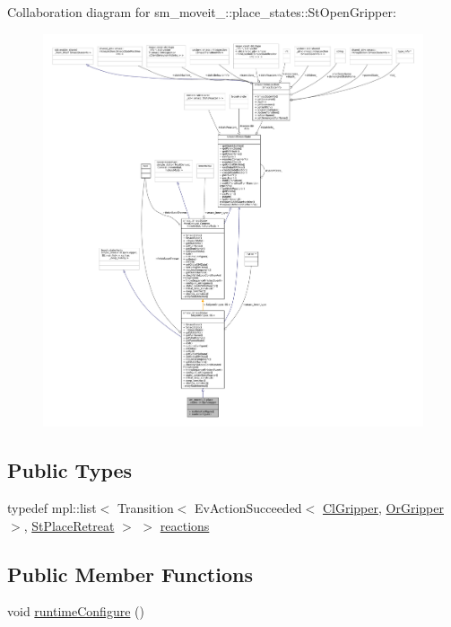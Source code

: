 Collaboration diagram for sm\+\_\+moveit\+\_\+:\+:place\+\_\+states\+:\+:St\+Open\+Gripper\+:
\nopagebreak
\begin{figure}[H]
\begin{center}
\leavevmode
\includegraphics[width=350pt]{structsm__moveit__4_1_1place__states_1_1StOpenGripper__coll__graph}
\end{center}
\end{figure}
\subsection*{Public Types}
\begin{DoxyCompactItemize}
\item 
typedef mpl\+::list$<$ Transition$<$ Ev\+Action\+Succeeded$<$ \hyperlink{classsm__moveit__4_1_1cl__gripper_1_1ClGripper}{Cl\+Gripper}, \hyperlink{classsm__moveit__4_1_1OrGripper}{Or\+Gripper} $>$, \hyperlink{structsm__moveit__4_1_1place__states_1_1StPlaceRetreat}{St\+Place\+Retreat} $>$ $>$ \hyperlink{structsm__moveit__4_1_1place__states_1_1StOpenGripper_a66d2d0a95ac3b2d672ac8d3735fd2a3c}{reactions}
\end{DoxyCompactItemize}
\subsection*{Public Member Functions}
\begin{DoxyCompactItemize}
\item 
void \hyperlink{structsm__moveit__4_1_1place__states_1_1StOpenGripper_a4ed0bd438003c52f035b3d3fb8cb7ac3}{runtime\+Configure} ()
\end{DoxyCompactItemize}
